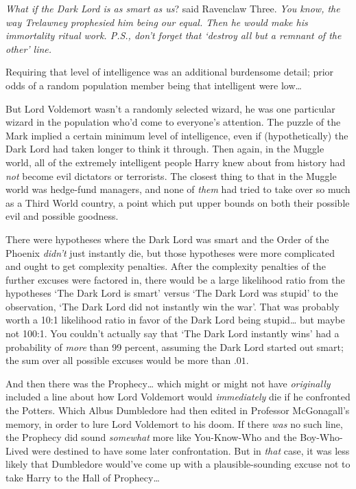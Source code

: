 \emph{What if the Dark Lord \emph{is} as smart as us}? said Ravenclaw Three. \emph{You know, the way Trelawney prophesied him being our \emph{equal}. Then he would \emph{make} his immortality ritual work. P.S., don't forget that `destroy all but a remnant of the other' line.}

Requiring that level of intelligence was an additional burdensome detail; prior odds of a random population member being that intelligent were low{\ldots}

But Lord Voldemort wasn't a randomly selected wizard, he was one particular wizard in the population who'd come to everyone's attention. The puzzle of the Mark implied a certain minimum level of intelligence, even if (hypothetically) the Dark Lord had taken longer to think it through. Then again, in the Muggle world, all of the extremely intelligent people Harry knew about from history had \emph{not} become evil dictators or terrorists. The closest thing to that in the Muggle world was hedge-fund managers, and none of \emph{them} had tried to take over so much as a Third World country, a point which put upper bounds on both their possible evil and possible goodness.

There were hypotheses where the Dark Lord was smart and the Order of the Phoenix \emph{didn't} just instantly die, but those hypotheses were more complicated and ought to get complexity penalties. After the complexity penalties of the further excuses were factored in, there would be a large likelihood ratio from the hypotheses `The Dark Lord is smart' versus `The Dark Lord was stupid' to the observation, `The Dark Lord did not instantly win the war'. That was probably worth a 10:1 likelihood ratio in favor of the Dark Lord being stupid{\ldots} but maybe not 100:1. You couldn't actually say that `The Dark Lord instantly wins' had a probability of \emph{more} than 99 percent, assuming the Dark Lord started out smart; the sum over all possible excuses would be more than $.01$.

And then there was the Prophecy{\ldots} which might or might not have \emph{originally} included a line about how Lord Voldemort would \emph{immediately} die if he confronted the Potters. Which Albus Dumbledore had then edited in Professor McGonagall's memory, in order to lure Lord Voldemort to his doom. If there \emph{was} no such line, the Prophecy did sound \emph{somewhat} more like You-Know-Who and the Boy-Who-Lived were destined to have some later confrontation. But in \emph{that} case, it was less likely that Dumbledore would've come up with a plausible-sounding excuse not to take Harry to the Hall of Prophecy{\ldots}

